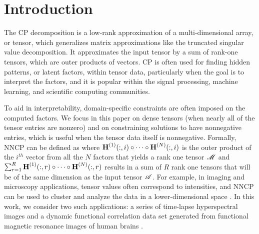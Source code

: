 
\section{Introduction}

The CP decomposition is a low-rank approximation of a multi-dimensional array, or tensor, which generalizes matrix approximations like the truncated singular value decomposition.
It approximates the input tensor by a sum of rank-one tensors, which are outer products of vectors.
CP is often used for finding hidden patterns, or latent factors, within tensor data, particularly when the goal is to interpret the factors, and it is popular within the signal processing, machine learning, and scientific computing communities.



To aid in interpretability, domain-specific constraints are often imposed on the computed factors.
We focus in this paper on dense tensors (when nearly all of the tensor entries are nonzero) and on constraining solutions to have nonnegative entries, which is useful when the tensor data itself is nonnegative. Formally, NNCP can be defined as
where $\Mn{H}{1}(:,i) \circ \cdots \circ \Mn{H}{N}(:,i)$ is the outer product of the $i^{th}$ vector from all the $N$ factors that yields a rank one tensor $\T{M}$ and $\sum_{r=1}^R \Mn{H}{1}(:,r) \circ \cdots \circ \Mn{H}{N}(:,r)$ results in a sum of $R$ rank one tensors that will be of the same dimension as the input tensor $\TA$. 
For example, in imaging and microscopy applications, tensor values often correspond to intensities, and NNCP can be used to cluster and analyze the data in a lower-dimensional space \cite{JC+16}.
In this work, we consider two such applications: a series of time-lapse hyperspectral images \cite{FAN16} and a dynamic functional correlation data set generated from functional magnetic resonance images of human brains \cite{VEU+12}.

